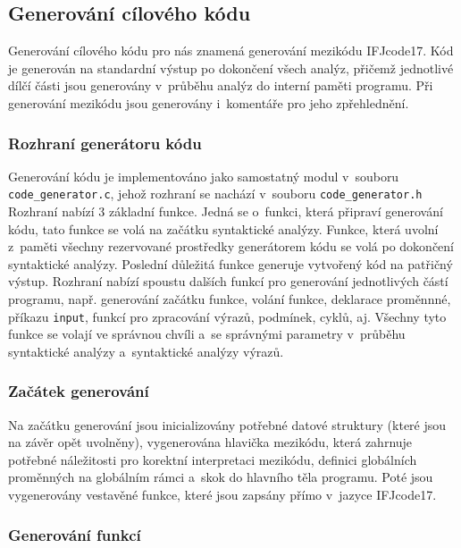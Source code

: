 \documentclass[a4paper, 11pt]{article}
\begin{document}
	\subsection{Generování cílového kódu}

	Generování cílového kódu pro nás znamená generování mezikódu IFJcode17. Kód je generován na standardní výstup
	po dokončení všech analýz, přičemž jednotlivé dílčí části jsou generovány v~průběhu analýz do interní paměti
	programu. Při generování mezikódu jsou generovány i~komentáře pro jeho zpřehlednění.

	\subsubsection{Rozhraní generátoru kódu}

	Generování kódu je implementováno jako samostatný modul v~souboru \texttt{code\_generator.c},
	jehož rozhraní se nachází v~souboru \texttt{code\_generator.h} Rozhraní nabízí 3 základní funkce.
	Jedná se o~funkci, která připraví generování kódu, tato funkce se volá na začátku syntaktické analýzy.
	Funkce, která uvolní z~paměti všechny rezervované prostředky generátorem kódu se volá po dokončení
	syntaktické analýzy. Poslední důležitá funkce generuje vytvořený kód na patřičný výstup. Rozhraní
	nabízí spoustu dalších funkcí pro generování jednotlivých částí programu, např. generování začátku
	funkce, volání funkce, deklarace proměnnné, příkazu \texttt{input}, funkcí pro zpracování výrazů,
	podmínek, cyklů, aj. Všechny tyto funkce se volají ve správnou chvíli a~se správnými
	parametry v~průběhu syntaktické analýzy a~syntaktické analýzy výrazů.

	\subsubsection{Začátek generování}

	Na začátku generování jsou inicializovány potřebné datové struktury (které jsou na závěr
	opět uvolněny), vygenerována hlavička mezikódu, která zahrnuje potřebné náležitosti pro korektní
	interpretaci mezikódu, definici globálních proměnných na globálním rámci a~skok do hlavního
	těla programu. Poté jsou vygenerovány vestavěné funkce, které jsou zapsány přímo v~jazyce IFJcode17.

	\subsubsection{Generování funkcí}
\end{document}
